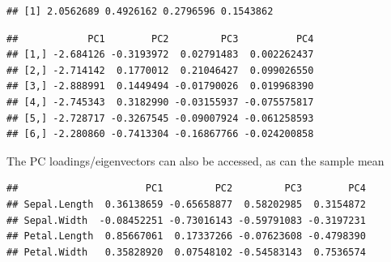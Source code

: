 \documentclass[
]{book}
\newenvironment{Shaded}{\begin{snugshade}}{\end{snugshade}}
\newcommand{\CommentTok}[1]{\textcolor[rgb]{0.56,0.35,0.01}{\textit{#1}}}
\newcommand{\DecValTok}[1]{\textcolor[rgb]{0.00,0.00,0.81}{#1}}
\newcommand{\FunctionTok}[1]{\textcolor[rgb]{0.13,0.29,0.53}{\textbf{#1}}}
\newcommand{\NormalTok}[1]{#1}
\newcommand{\OtherTok}[1]{\textcolor[rgb]{0.56,0.35,0.01}{#1}}
\newcommand{\SpecialCharTok}[1]{\textcolor[rgb]{0.81,0.36,0.00}{\textbf{#1}}}
\theoremstyle{definition}
\theoremstyle{definition}
\theoremstyle{definition}
\theoremstyle{definition}
\theoremstyle{remark}
\begin{document}
\begin{Shaded}
\end{Shaded}

\begin{verbatim}
## [1] 2.0562689 0.4926162 0.2796596 0.1543862
\end{verbatim}

\begin{Shaded}
\end{Shaded}

\begin{verbatim}
##            PC1        PC2         PC3          PC4
## [1,] -2.684126 -0.3193972  0.02791483  0.002262437
## [2,] -2.714142  0.1770012  0.21046427  0.099026550
## [3,] -2.888991  0.1449494 -0.01790026  0.019968390
## [4,] -2.745343  0.3182990 -0.03155937 -0.075575817
## [5,] -2.728717 -0.3267545 -0.09007924 -0.061258593
## [6,] -2.280860 -0.7413304 -0.16867766 -0.024200858
\end{verbatim}

The PC loadings/eigenvectors can also be accessed, as can the sample mean

\begin{Shaded}
\end{Shaded}

\begin{verbatim}
##                      PC1         PC2         PC3        PC4
## Sepal.Length  0.36138659 -0.65658877  0.58202985  0.3154872
## Sepal.Width  -0.08452251 -0.73016143 -0.59791083 -0.3197231
## Petal.Length  0.85667061  0.17337266 -0.07623608 -0.4798390
## Petal.Width   0.35828920  0.07548102 -0.54583143  0.7536574
\end{verbatim}

\begin{Shaded}
\end{Shaded}
\end{document}
